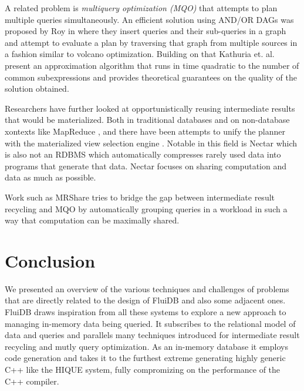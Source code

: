 A related problem is \emph{multiquery optimization (MQO)}
\cite{theodoratosDataWarehouseConfiguration1997} that attempts to plan
multiple queries simultaneously. An efficient solution using AND/OR
DAGs was proposed by Roy in
\cite{royEfficientExtensibleAlgorithms2000} where they insert queries
and their sub-queries in a graph and attempt to evaluate a plan by
traversing that graph from multiple sources in a fashion similar to
volcano optimization. Building on that Kathuria
et. al. \cite{kathuriaEfficientProvableMultiquery2017} present an
approximation algorithm that runs in time quadratic to the number of
common subexpressions and provides theoretical guarantees on the
quality of the solution obtained.

Researchers have further looked at opportunistically reusing
intermediate results that would be materialized. Both in traditional
databases
\cite{ivanovaArchitectureRecyclingIntermediates2010,nagelRecyclingPipelinedQuery2013}
and on non-database xontexts like MapReduce
\cite{elghandourReStoreReusingResults2012a}, and there have been
attempts to unify the planner with the materialized view selection
engine \cite{perezHistoryawareQueryOptimization2014a}. Notable in this
field is Nectar \cite{gundaNectarAutomaticManagement2010} which is
also not an RDBMS which automatically compresses rarely used data into
programs that generate that data. Nectar focuses on sharing
computation and data as much as possible.

Work such as MRShare \cite{nykielMRShareSharingMultiple2010} tries to
bridge the gap between intermediate result recycling and MQO by
automatically grouping queries in a workload in such a way that
computation can be maximally shared.

\section{Conclusion}

We presented an overview of the various techniques and challenges of
problems that are directly related to the design of FluiDB and also
some adjacent ones. FluiDB draws inspiration from all these systems to
explore a new approach to managing in-memory data being queried. It
subscribes to the relational model of data and queries and parallels
many techniques introduced for intermediate result recycling and mutly
query optimization. As an in-memory database it employs code
generation and takes it to the furthest extreme generating highly
generic C++ like the HIQUE system, fully compromizing on the
performance of the C++ compiler.
